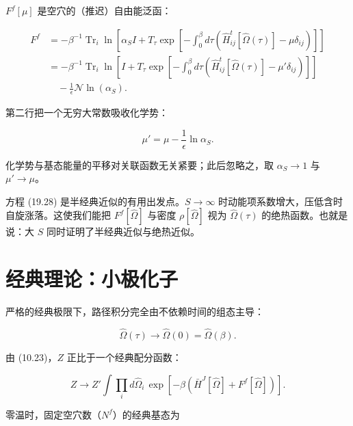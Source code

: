 $F^{f}[\mu]$ 是空穴的（推迟）自由能泛函：

\begin{align*}
F ^ {f} & = - \beta^ {- 1} \operatorname{Tr}_{i} \ln \left[ \alpha_{S} I + T_{\tau} \exp \left[ - \int_ {0} ^ {\beta} d \tau \left( \hat {H}_{ij} ^ {t} [ \hat {\Omega} ( \tau ) ] - \mu \delta_{ij} \right) \right] \right]\\
& = - \beta^ {- 1} \operatorname{Tr}_{i} \ln \left[ I + T_{\tau} \exp \left[ - \int_ {0} ^ {\beta} d \tau \left( \hat {H}_{ij} ^ {t} [ \hat {\Omega} ( \tau ) ] - \mu ' \delta_{ij} \right) \right] \right]\\
& \quad - \frac {1}{\epsilon} \mathcal {N} \ln \left( \alpha_{S} \right) .
\tag{19.29}
\end{align*}

第二行把一个无穷大常数吸收化学势：

\begin{equation*}
\mu ' = \mu - \frac {1}{\epsilon} \ln \alpha_{S}.
\tag{19.30}
\end{equation*}

化学势与基态能量的平移对关联函数无关紧要；此后忽略之，取 $\alpha_{S} \rightarrow 1$ 与 $\mu' \rightarrow \mu$。

方程 (19.28) 是半经典近似的有用出发点。$S \to \infty$ 时动能项系数增大，压低含时自旋涨落。这使我们能把 $F^{f}[\hat{\Omega}]$ 与密度 $\rho[\hat{\Omega}]$ 视为 $\hat{\Omega}(\tau)$ 的绝热函数。也就是说：大 $S$ 同时证明了半经典近似与绝热近似。

\section{经典理论：小极化子}

严格的经典极限下，路径积分完全由不依赖时间的组态主导：

\begin{equation*}
\hat {\Omega} ( \tau ) \rightarrow \hat {\Omega} ( 0 ) = \hat {\Omega} ( \beta ).
\tag{19.31}
\end{equation*}

由 (10.23)，$Z$ 正比于一个经典配分函数：

\begin{equation*}
Z \rightarrow Z ' \int \prod_ {i} d \hat {\Omega} _ {i} \, \exp \left[ - \beta \left( \bar {H} ^ {J} [ \hat {\Omega} ] + F ^ {f} [ \hat {\Omega} ] \right) \right].
\tag{19.32}
\end{equation*}

零温时，固定空穴数（$N^{f}$）的经典基态为

